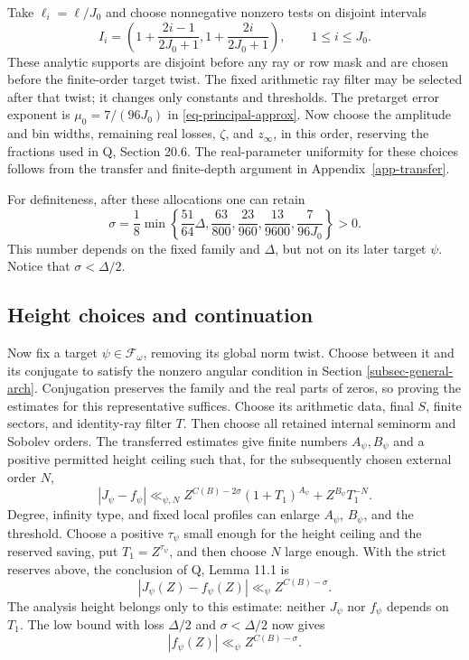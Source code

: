 \documentclass[11pt,a4paper]{article}
\theoremstyle{remark}\newtheorem{remark}[theorem]{Remark}
\newcommand{\Packet}{\mathscr F_\omega}
\numberwithin{equation}{section}
\begin{document}
Take $\ell_i=\ell/J_0$ and choose nonnegative nonzero tests on
disjoint intervals
\[
 I_i=\left(1+\frac{2i-1}{2J_0+1},
           1+\frac{2i}{2J_0+1}\right),\qquad 1\le i\le J_0.
\]
These analytic supports are disjoint before any ray or row mask
and are chosen before the finite-order target twist. The fixed
arithmetic ray filter may be selected after that twist; it changes
only constants and thresholds. The pretarget error exponent is
$\mu_0=7/(96J_0)$ in \eqref{eq-principal-approx}.
Now choose the amplitude and bin widths, remaining real
losses, $\zeta$, and $z_\infty$, in this order, reserving
the fractions used in Q, Section 20.6.
The real-parameter uniformity for these choices follows from the
transfer and finite-depth argument in Appendix~\ref{app-transfer}.

For definiteness, after these allocations one can retain
\begin{equation}\label{eq-sigma}
 \sigma=\frac18\min\left\{
      \frac{51}{64}\Delta,\frac{63}{800},
      \frac{23}{960},\frac{13}{9600},\frac7{96J_0}
                       \right\}>0.
\end{equation}
This number depends on the fixed family and $\Delta$, but
not on its later target $\psi$. Notice that
$\sigma<\Delta/2$.

\subsection{Height choices and continuation}

Now fix a target $\psi\in\Packet$, removing its global norm
twist. Choose between it and its conjugate to satisfy the
nonzero angular condition in Section \ref{subsec-general-arch}.
Conjugation preserves the family and the real parts of zeros,
so proving the estimates for this representative suffices.
Choose its arithmetic data, final $S$, finite sectors, and
identity-ray filter $T$. Then choose all retained internal
seminorm and Sobolev orders.
The transferred estimates give finite numbers
$A_\psi,B_\psi$ and a positive permitted height ceiling such
that, for the subsequently chosen external order $N$,
\[
 |J_\psi-f_\psi|
 \ll_{\psi,N}
 Z^{C(B)-2\sigma}(1+T_1)^{A_\psi}
       +Z^{B_\psi}T_1^{-N}.
\]
Degree, infinity type, and fixed local profiles can enlarge
$A_\psi$, $B_\psi$, and the threshold. Choose a positive
$\tau_\psi$ small enough for the height ceiling and the
reserved saving, put $T_1=Z^{\tau_\psi}$, and then choose
$N$ large enough. With the strict reserves above, the
conclusion of Q, Lemma 11.1 is
\begin{equation}\label{eq-high-final}
 |J_\psi(Z)-f_\psi(Z)|\ll_\psi Z^{C(B)-\sigma}.
\end{equation}
The analysis height belongs only to this estimate:
neither $J_\psi$ nor $f_\psi$ depends on $T_1$.
The low bound with loss $\Delta/2$ and
$\sigma<\Delta/2$ now gives
\begin{equation}\label{eq-f-bound}
 |f_\psi(Z)|\ll_\psi Z^{C(B)-\sigma}.
\end{equation}
\end{document}
